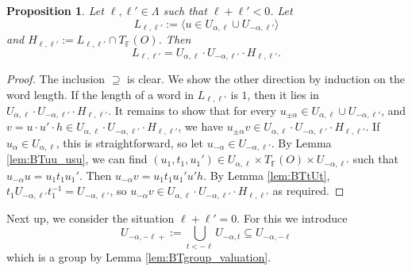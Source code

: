 \documentclass[12pt]{amsart}
\newcommand{\F}{\mathbb{F} }
\numberwithin{equation}{section}
\newtheorem{proposition}[theorem]{Proposition}
\theoremstyle{remark} %
\begin{document}
		\begin{proposition}\label{prop:BTL_l+l'<0} %
			Let 
			$\ell, \ell' \in \Lambda$ such that $\ell + \ell' <0$. Let 
			$$
			L_{\ell, \ell'} := \langle u \in U_{\alpha, \ell} \cup U_{-\alpha, \ell'} \rangle 
			$$
			and $H_{\ell, \ell'} := L_{\ell,\ell'} \cap T_\F(O) $. Then
			$$
			L_{\ell,\ell'} = U_{\alpha, \ell} \cdot U_{-\alpha, \ell'} \cdot H_{\ell,\ell'} .
			$$
		\end{proposition}
		\begin{proof}
			The inclusion $\supseteq$ is clear. We show the other direction by induction on the word length. If the length of a word in $L_{\ell, \ell'}$ is $1$, then it lies in $U_{\alpha, \ell} \cdot U_{-\alpha, \ell'} \cdot H_{\ell,\ell'}$. It remains to show that for every $u_{\pm \alpha} \in U_{\alpha, \ell} \cup U_{-\alpha,\ell'}$, and $v = u \cdot u' \cdot h \in U_{\alpha, \ell} \cdot U_{-\alpha, \ell'} \cdot H_{\ell,\ell'} $, we have $u_{\pm \alpha} v \in U_{\alpha, \ell} \cdot U_{-\alpha, \ell'} \cdot H_{\ell,\ell'}$. If $u_\alpha \in U_{\alpha,\ell}$, this is straightforward, so let $u_{-\alpha} \in U_{-\alpha,\ell'}$. By Lemma \ref{lem:BTuu_usu}, we can find $(u_1,t_1,u_1') \in U_{\alpha,\ell}\times T_\F(O) \times U_{-\alpha,\ell'}$ such that $u_{-\alpha}u = u_1t_1u_1'$. Then $u_{-\alpha}v = u_1 t_1 u_1' u' h$. By Lemma \ref{lem:BTtUt}, $t_1U_{-\alpha,\ell'} t_1^{-1} = U_{-\alpha,\ell'}$, so $u_{-\alpha}v \in U_{\alpha,\ell}\cdot U_{-\alpha,\ell'} \cdot H_{\ell,\ell'}$ as required.
		\end{proof}
		Next up, we consider the situation $\ell + \ell' = 0$. For this we introduce
		$$
		U_{-\alpha, -\ell+} := \bigcup_{t < -\ell} U_{-\alpha, t} \subseteq U_{-\alpha, -\ell}
		$$
		which is a group by Lemma \ref{lem:BTgroup_valuation}.
		
\end{document}
